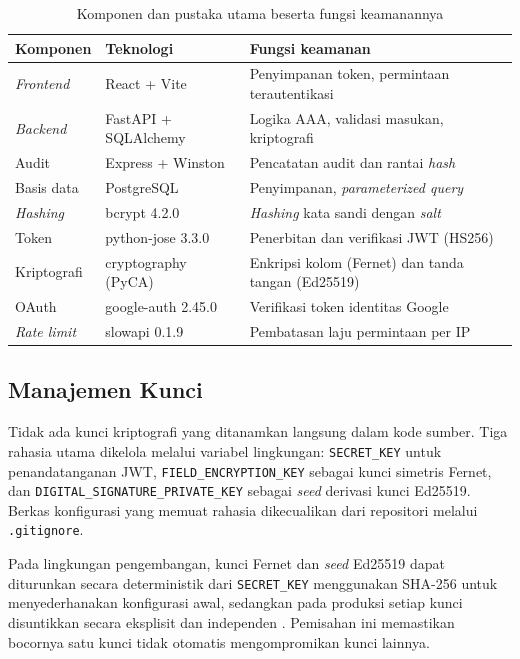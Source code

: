 \documentclass[12pt,a4paper]{article}
\begin{document}
\begin{table}[H]
  \caption{Komponen dan pustaka utama beserta fungsi keamanannya}
  \label{tab:tools}
  \centering
  \begin{tabularx}{\textwidth}{l l X}
    \toprule
    Komponen & Teknologi & Fungsi keamanan \\
    \midrule
    \textit{Frontend}    & React + Vite         & Penyimpanan token, permintaan terautentikasi \\
    \textit{Backend}     & FastAPI + SQLAlchemy & Logika AAA, validasi masukan, kriptografi \\
    Audit                & Express + Winston    & Pencatatan audit dan rantai \textit{hash} \\
    Basis data           & PostgreSQL           & Penyimpanan, \textit{parameterized query} \\
    \textit{Hashing}     & bcrypt 4.2.0         & \textit{Hashing} kata sandi dengan \textit{salt} \\
    Token                & python-jose 3.3.0    & Penerbitan dan verifikasi JWT (HS256) \\
    Kriptografi          & cryptography (PyCA)  & Enkripsi kolom (Fernet) dan tanda tangan (Ed25519) \\
    OAuth                & google-auth 2.45.0   & Verifikasi token identitas Google \\
    \textit{Rate limit}  & slowapi 0.1.9        & Pembatasan laju permintaan per IP \\
    \bottomrule
  \end{tabularx}
\end{table}

\subsection{Manajemen Kunci}

Tidak ada kunci kriptografi yang ditanamkan langsung dalam kode sumber.
Tiga rahasia utama dikelola melalui variabel lingkungan:
\texttt{SECRET\_KEY} untuk penandatanganan JWT,
\texttt{FIELD\_ENCRYPTION\_KEY} sebagai kunci simetris Fernet, dan
\texttt{DIGITAL\_SIGNATURE\_PRIVATE\_KEY} sebagai \textit{seed}
derivasi kunci Ed25519. Berkas konfigurasi yang memuat rahasia
dikecualikan dari repositori melalui \texttt{.gitignore}.

Pada lingkungan pengembangan, kunci Fernet dan \textit{seed} Ed25519
dapat diturunkan secara deterministik dari \texttt{SECRET\_KEY}
menggunakan SHA-256 untuk menyederhanakan konfigurasi awal, sedangkan
pada produksi setiap kunci disuntikkan secara eksplisit dan independen
\citep{NISTSP80057}. Pemisahan ini memastikan bocornya satu kunci tidak
otomatis mengompromikan kunci lainnya.
\end{document}
